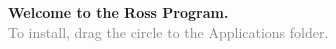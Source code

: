 \documentclass[12pt]{article}
\begin{document}
\sloppy

\begin{center}
  \textbf{\Large Welcome to the Ross Program.} \\[2ex]
  \textcolor{gray}{To install, drag the circle to the Applications folder.}
\end{center}

\vfill
\begin{center}
  \scalebox{4}{$\to$}
\end{center}
\vfill
\end{document}
